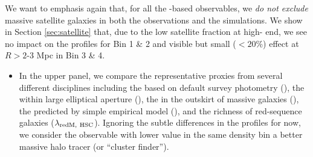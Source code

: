 \documentclass[a4paper,fleqn,usenatbib]{mnras}
\begin{document}

    We want to emphasis again that, for all the \mstar{}-based observables, we \emph{do not
    exclude} massive satellite galaxies in both the observations and the simulations. 
    We show in Section \ref{sec:satellite} that, due to the low satellite fraction at high-\mstar{}
    end, we see no impact on the \dsigma{} profiles for Bin 1 \& 2 and visible but small ($<20$\%)
    effect at $R>2$-3 Mpc in Bin 3 \& 4.
    

    \begin{itemize}

        \item In the upper panel, we compare the representative \mvir{} proxies from several different 
            disciplines including the \mstar{} based on default survey photometry (\mcmodel{}), 
            the \mstar{} within large elliptical aperture (), the \mstar{} in the outskirt of 
            massive galaxies (), the \mvir{} predicted by simple empirical 
            model (\masap{}), and the richness of red-sequence galaxies 
            ($\lambda_{\rm redM,\ HSC}$).
            Ignoring the subtle differences in the \dsigma{} profiles for now, we consider 
            the observable with lower \sighalo{} value in the same density bin a better massive halo 
            tracer (or ``cluster finder'').
        

\end{itemize}
\end{document}
